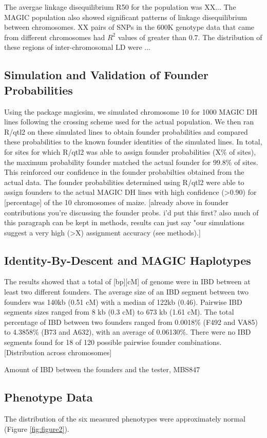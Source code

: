 \documentclass[article,9pt,twocolumn,twoside]{rilabRxiv}
\begin{document}
The avergae linkage disequilibrium R50 for the population was XX...
The MAGIC population also showed significant patterns of linkage disequilibrium between chromosomes. XX pairs of SNPs in the 600K genotype data that came from different chromosomes had $R^2$ values of greater than 0.7. The distribution of these regions of inter-chromosomal LD were ...

\subsection{Simulation and Validation of Founder Probabilities}
Using the package magicsim, we simulated chromosome 10 for 1000 MAGIC DH lines following the crossing scheme used for the actual population.
We then ran R/qtl2 on these simulated lines to obtain founder probabilities and compared these probabilities to the known founder identities of the simulated lines.
In total, for sites for which R/qtl2 was able to assign founder probabilities (X\% of sites), the maximum probability founder matched the actual founder for 99.8\% of sites.
This reinforced our confidence in the founder probabilties obtained from the actual data.
The founder probabilities determined using R/qtl2 were able to assign founders to the actual MAGIC DH lines with high confidence (>0.90) for [percentage] of the 10 chromosomes of maize.
[already above in founder contributions you’re discussing the founder probs. i’d put this first? also much of this paragraph can be kept in methods, results can just say "our simulations suggest a very high (>X) assignment accuracy (see methods).]

\subsection{Identity-By-Descent and MAGIC Haplotypes}
The results showed that a total of [bp][cM] of genome were in IBD between at least two different founders.
The average size of an IBD segment between two founders was 140kb (0.51 cM) with a median of 122kb (0.46).
Pairwise IBD segments sizes ranged from 8 kb (0.3 cM) to  673 kb (1.61 cM).
The total percentage of IBD between two founders ranged from 0.0018\% (F492 and VA85) to 4.3858\% (B73 and A632), with an average of 0.06130\%.
There were no IBD segments found for 18 of 120 possible pairwise founder combinations.  [Distribution across chromosomes]

Amount of IBD between the founders and the tester, MBS847


\subsection{Phenotype Data}
The distribution of the six measured phenotypes were approximately normal (Figure \ref{fig:figure2}).
\end{document}
